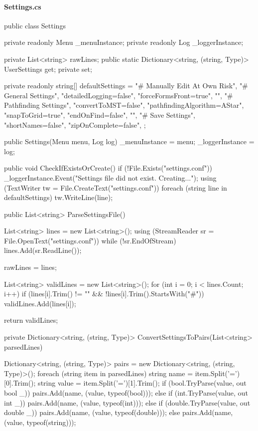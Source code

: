 \begin{flushleft}
    \paragraph{Settings.cs}
    \begin{cscode}
public class Settings
{
    private readonly Menu _menuInstance;
    private readonly Log _loggerInstance;

    private List<string> rawLines;
    public static Dictionary<string, (string, Type)> UserSettings { get; private set; }

    private readonly string[] defaultSettings = {
        "# Manually Edit At Own Risk",
        "# General Settings",
        "detailedLogging=false",
        "forceFormsFront=true",
        "",
        "# Pathfinding Settings",
        "convertToMST=false",
        "pathfindingAlgorithm=AStar",
        "snapToGrid=true",
        "endOnFind=false",
        "",
        "# Save Settings",
        "shortNames=false",
        "zipOnComplete=false",
    };

    public Settings(Menu menu, Log log)
    {
        _menuInstance = menu;
        _loggerInstance = log;
    }

    public void CheckIfExistsOrCreate()
    {
        if (!File.Exists("settings.conf"))
        {
            _loggerInstance.Event("Settings file did not exist. Creating...");
            using (TextWriter tw = File.CreateText("settings.conf"))
            {
                foreach (string line in defaultSettings)
                {
                    tw.WriteLine(line);
                }
            }
        }
    }

    public List<string> ParseSettingsFile()
    {
        List<string> lines = new List<string>();
        using (StreamReader sr = File.OpenText("settings.conf"))
        {
            while (!sr.EndOfStream)
            {
                lines.Add(sr.ReadLine());
            }
        }

        rawLines = lines;

        List<string> validLines = new List<string>();
        for (int i = 0; i < lines.Count; i++)
        {
            if (lines[i].Trim() != "" && !lines[i].Trim().StartsWith("#")) validLines.Add(lines[i]);
        }

        return validLines;
    }

    private Dictionary<string, (string, Type)> ConvertSettingsToPairs(List<string> parsedLines)
    {
        Dictionary<string, (string, Type)> pairs = new Dictionary<string, (string, Type)>();
        foreach (string item in parsedLines)
        {
            string name = item.Split('=')[0].Trim();
            string value = item.Split('=')[1].Trim();
            if (bool.TryParse(value, out bool _)) pairs.Add(name, (value, typeof(bool)));
            else if (int.TryParse(value, out int _)) pairs.Add(name, (value, typeof(int)));
            else if (double.TryParse(value, out double _)) pairs.Add(name, (value, typeof(double)));
            else pairs.Add(name, (value, typeof(string)));
        }

}}
\end{cscode}
\end{flushleft}

